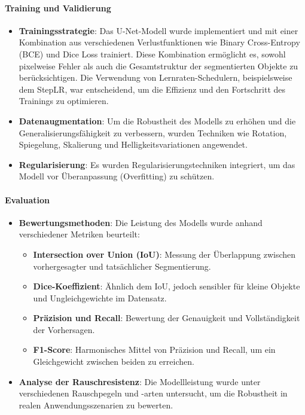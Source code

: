 \paragraph{Training und Validierung}
\begin{itemize} 

\item \textbf{Trainingsstrategie}: Das U-Net-Modell wurde implementiert und mit einer Kombination aus verschiedenen Verlustfunktionen wie Binary Cross-Entropy (BCE) und Dice Loss trainiert. Diese Kombination ermöglicht es, sowohl pixelweise Fehler als auch die Gesamtstruktur der segmentierten Objekte zu berücksichtigen. Die Verwendung von Lernraten-Schedulern, beispielsweise dem StepLR, war entscheidend, um die Effizienz und den Fortschritt des Trainings zu optimieren.

\item \textbf{Datenaugmentation}: Um die Robustheit des Modells zu erhöhen und die Generalisierungsfähigkeit zu verbessern, wurden Techniken wie Rotation, Spiegelung, Skalierung und Helligkeitsvariationen angewendet.

\item \textbf{Regularisierung}: Es wurden Regularisierungstechniken integriert, um das Modell vor Überanpassung (Overfitting) zu schützen.

\end{itemize}

\paragraph{Evaluation}
\begin{itemize} 

\item \textbf{Bewertungsmethoden}: Die Leistung des Modells wurde anhand verschiedener Metriken beurteilt: 
    \begin{itemize} 
    \item \textbf{Intersection over Union (IoU)}: Messung der Überlappung zwischen vorhergesagter und tatsächlicher Segmentierung. 
    \item \textbf{Dice-Koeffizient}: Ähnlich dem IoU, jedoch sensibler für kleine Objekte und Ungleichgewichte im Datensatz.
    \item \textbf{Präzision und Recall}: Bewertung der Genauigkeit und Vollständigkeit der Vorhersagen. 
    \item \textbf{F1-Score}: Harmonisches Mittel von Präzision und Recall, um ein Gleichgewicht zwischen beiden zu erreichen. \end{itemize}
            
\item \textbf{Analyse der Rauschresistenz}: Die Modellleistung wurde unter verschiedenen Rauschpegeln und -arten untersucht, um die Robustheit in realen Anwendungsszenarien zu bewerten.
\end{itemize}
            
